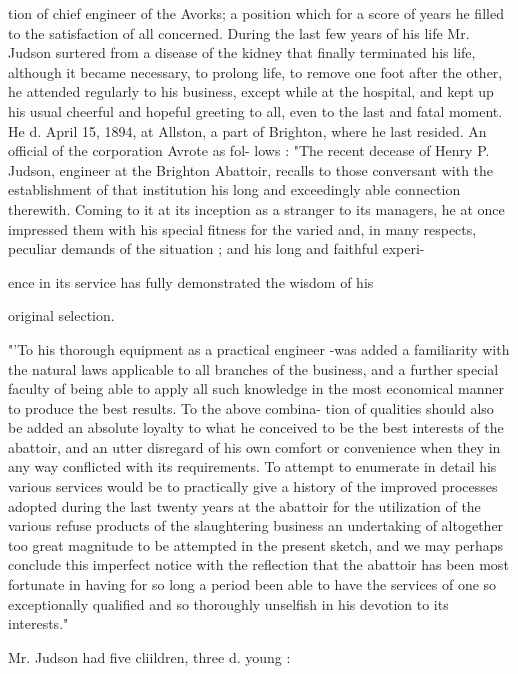 \documentclass[oneside]{book}
\begin{document}
tion of chief engineer of the Avorks; a position which for a 
score of years he filled to the satisfaction of all concerned. 
During the last few years of his life Mr. Judson surtered from 
a disease of the kidney that finally terminated his life, 
although it became necessary, to prolong life, to remove 
one foot after the other, he attended regularly to his business, 
except while at the hospital, and kept up his usual cheerful 
and hopeful greeting to all, even to the last and fatal moment. 
He d. April 15, 1894, at Allston, a part of Brighton, where 
he last resided. An official of the corporation Avrote as fol- 
lows : "The recent decease of Henry P. Judson, engineer 
at the Brighton Abattoir, recalls to those conversant with the 
establishment of that institution his long and exceedingly 
able connection therewith. Coming to it at its inception as a 
stranger to its managers, he at once impressed them with his 
special fitness for the varied and, in many respects, peculiar 
demands of the situation ; and his long and faithful experi- 




 ence in its service has fully demonstrated the wisdom of his 

original selection. 

"'To his thorough equipment as a practical engineer -was 
added a familiarity with the natural laws applicable to all 
branches of the business, and a further special faculty of 
being able to apply all such knowledge in the most economical 
manner to produce the best results. To the above combina- 
tion of qualities should also be added an absolute loyalty to 
what he conceived to be the best interests of the abattoir, 
and an utter disregard of his own comfort or convenience 
when they in any way conflicted with its requirements. To 
attempt to enumerate in detail his various services would be 
to practically give a history of the improved processes 
adopted during the last twenty years at the abattoir for the 
utilization of the various refuse products of the slaughtering 
business  an undertaking of altogether too great magnitude 
to be attempted in the present sketch, and we may perhaps 
conclude this imperfect notice with the reflection that the 
abattoir has been most fortunate in having for so long a 
period been able to have the services of one so exceptionally 
qualified and so thoroughly unselfish in his devotion to its 
interests." 

Mr. Judson had five cliildren, three d. young : 
\end{document}
